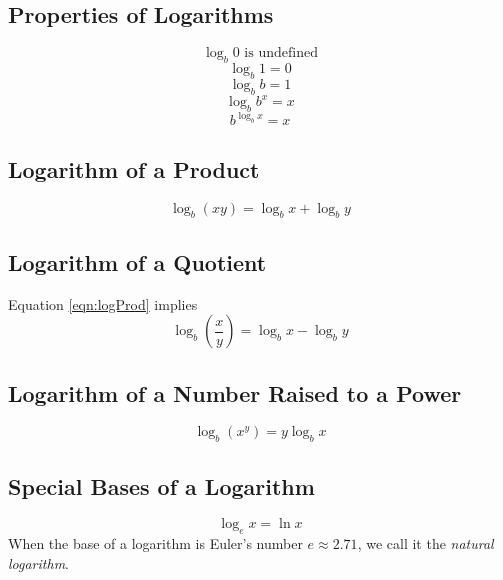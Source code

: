 \subsection{Properties of Logarithms}

\begin{equation*}
    \log_b 0 \text{ is undefined}
\end{equation*}
\begin{equation*}
    \log_b 1 = 0
\end{equation*}
\begin{equation*}
    \log_b b = 1
\end{equation*}
\begin{equation*}
    \log_b b^x = x
\end{equation*}
\begin{equation*}
    b^{\log_b x} = x
\end{equation*}

\subsection{Logarithm of a Product}

\begin{equation} \label{eqn:logProd}
    \log_b (xy) = \log_b x + \log_b y 
\end{equation}

\subsection{Logarithm of a Quotient}

Equation \eqref{eqn:logProd} implies
\begin{equation*}
    \log_b \left(\frac{x}{y}\right) = \log_b x - \log_b y
\end{equation*}

\subsection{Logarithm of a Number Raised to a Power}

\begin{equation*}
    \log_b (x^y) = y \log_b x
\end{equation*}

\subsection{Special Bases of a Logarithm}

\begin{equation*}
    \log_e x = \ln x
\end{equation*}
When the base of a logarithm is Euler's number $e \approx 2.71$, we call it the \textit{natural logarithm}.

